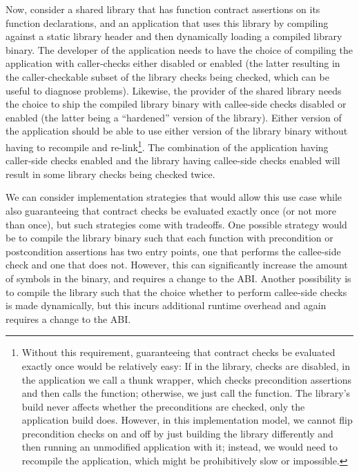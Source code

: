Now, consider a shared library that has function contract assertions on its function declarations, and an application that uses this library by compiling against a static library header and then dynamically loading a compiled library binary. The developer of the application needs to have the choice of compiling the application with caller-checks either disabled or enabled (the latter resulting in the caller-checkable subset of the library checks being checked, which can be useful to diagnose problems). Likewise, the provider of the shared library needs the choice to ship the compiled library binary with callee-side checks disabled or enabled (the latter being a ``hardened'' version of the library). Either version of the application should be able to use either version of the library binary without having to recompile and re-link\footnote{Without this requirement, guaranteeing that contract checks be evaluated exactly once would be relatively easy: If in the library, checks are disabled, in the application we call a thunk wrapper, which checks precondition assertions and then calls the function; otherwise, we just call the function. The library's build never affects whether the preconditions are checked, only the application build does. However, in this implementation model, we cannot flip precondition checks on and off by just building the library differently and then running an unmodified application with it; instead, we would need to recompile the application, which might be prohibitively slow or impossible.}. The combination of the application having caller-side checks enabled and the library having callee-side checks enabled will result in some library checks being checked twice. 

We can consider implementation strategies that would allow this use case while also guaranteeing that contract checks be evaluated exactly once (or not more than once), but such strategies come with tradeoffs. One possible strategy would be to compile the library binary such that each function with precondition or postcondition assertions has two entry points, one that performs the callee-side check and one that does not. However, this can significantly increase the amount of symbols in the binary, and requires a change to the ABI. Another possibility is to compile the library such that the choice whether to perform callee-side checks is made dynamically, but this incurs additional runtime overhead and again requires a change to the ABI.

